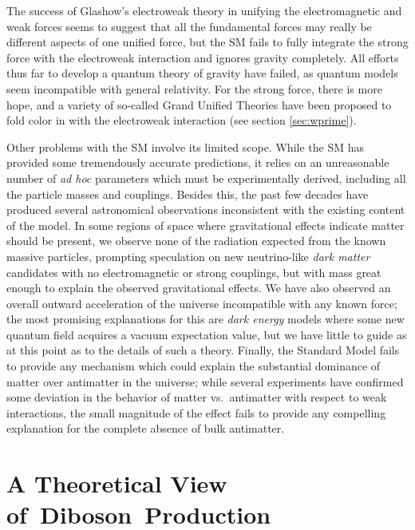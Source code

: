 The success of Glashow's electroweak theory in unifying the electromagnetic and weak forces seems to suggest that all the fundamental forces may really be different aspects of one unified force, but the SM fails to fully integrate the strong force with the electroweak interaction and ignores gravity completely.  All efforts thus far to develop a quantum theory of gravity have failed, as quantum models seem incompatible with general relativity.  For the strong force, there is more hope, and a variety of so-called Grand Unified Theories have been proposed to fold color in with the electroweak interaction (see section \ref{sec:wprime}).

Other problems with the SM involve its limited scope.  While the SM has provided some tremendously accurate predictions, it relies on an unreasonable number of \emph{ad hoc} parameters which must be experimentally derived, including all the particle masses and couplings.  Besides this, the past few decades have produced several astronomical observations inconsistent with the existing content of the model.  In some regions of space where gravitational effects indicate matter should be present, we observe none of the radiation expected from the known massive particles, prompting speculation on new neutrino-like \emph{dark matter} candidates with no electromagnetic or strong couplings, but with mass great enough to explain the observed gravitational effects.  We have also observed an overall outward acceleration of the universe incompatible with any known force; the most promising explanations for this are \emph{dark energy} models where some new quantum field acquires a vacuum expectation value, but we have little to guide as at this point as to the details of such a theory.  Finally, the Standard Model fails to provide any mechanism which could explain the substantial dominance of matter over antimatter in the universe; while several experiments have confirmed some deviation in the behavior of matter vs.\ antimatter with respect to weak interactions, the small magnitude of the effect fails to provide any compelling explanation for the complete absence of bulk antimatter.


\resetlinenumber
\chapter{A Theoretical View of~Diboson~Production}
\label{chapter:wz-theory}

